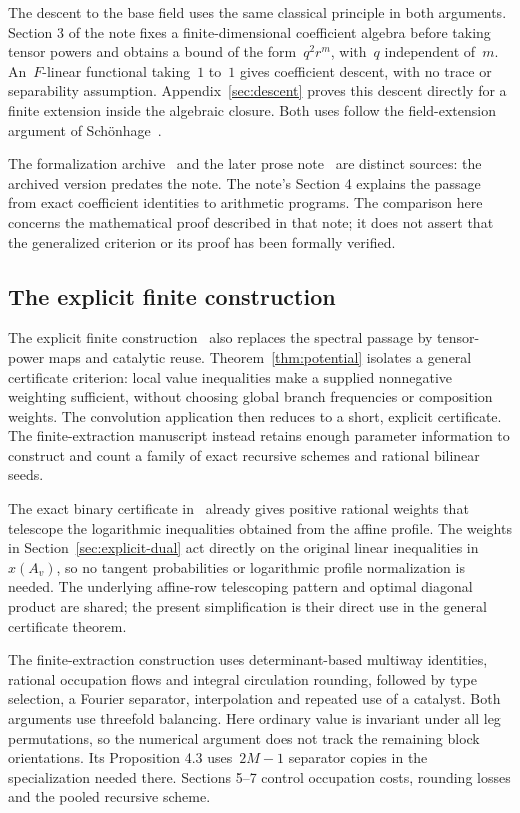 \documentclass[11pt,letterpaper]{article}
\theoremstyle{definition}
\numberwithin{equation}{section}
\begin{document}
The descent to the base field uses the same classical principle in both arguments. Section 3 of the note fixes a finite-dimensional coefficient algebra before taking tensor powers and obtains a bound of the form~$q^2r^m$, with~$q$ independent of~$m$. An~$F$-linear functional taking~$1$ to~$1$ gives coefficient descent, with no trace or separability assumption. Appendix~\ref{sec:descent} proves this descent directly for a finite extension inside the algebraic closure. Both uses follow the field-extension argument of Schönhage~\cite[Theorems 2.7--2.8]{Sch81}.

The formalization archive~\cite{Navot26} and the later prose note~\cite{NavotNote26} are distinct sources: the archived version predates the note. The note's Section 4 explains the passage from exact coefficient identities to arithmetic programs. The comparison here concerns the mathematical proof described in that note; it does not assert that the generalized criterion or its proof has been formally verified.

\subsection{The explicit finite construction}

The explicit finite construction~\cite{Extraction} also replaces the spectral passage by tensor-power maps and catalytic reuse. Theorem~\ref{thm:potential} isolates a general certificate criterion: local value inequalities make a supplied nonnegative weighting sufficient, without choosing global branch frequencies or composition weights. The convolution application then reduces to a short, explicit certificate. The finite-extraction manuscript instead retains enough parameter information to construct and count a family of exact recursive schemes and rational bilinear seeds.

The exact binary certificate in~\cite[Appendix A, Proposition A.1]{Extraction} already gives positive rational weights that telescope the logarithmic inequalities obtained from the affine profile. The weights in Section~\ref{sec:explicit-dual} act directly on the original linear inequalities in~$x(A_v)$, so no tangent probabilities or logarithmic profile normalization is needed. The underlying affine-row telescoping pattern and optimal diagonal product are shared; the present simplification is their direct use in the general certificate theorem.

The finite-extraction construction uses determinant-based multiway identities, rational occupation flows and integral circulation rounding, followed by type selection, a Fourier separator, interpolation and repeated use of a catalyst. Both arguments use threefold balancing. Here ordinary value is invariant under all leg permutations, so the numerical argument does not track the remaining block orientations. Its Proposition 4.3 uses~$2M-1$ separator copies in the specialization needed there. Sections 5--7 control occupation costs, rounding losses and the pooled recursive scheme.
\end{document}
